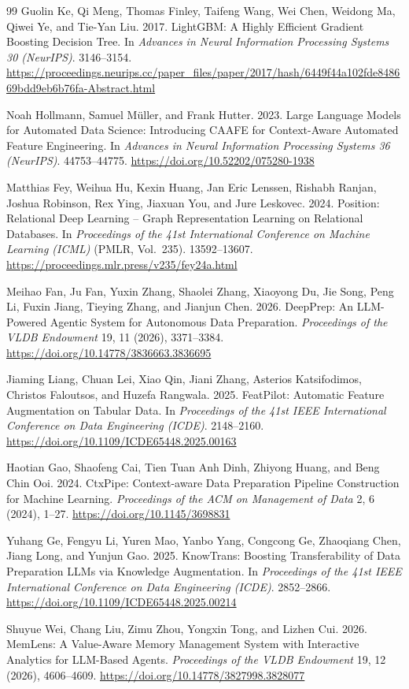 \begin{thebibliography}{99}
Guolin Ke, Qi Meng, Thomas Finley, Taifeng Wang, Wei Chen, Weidong Ma, Qiwei Ye, and Tie-Yan Liu. 2017. LightGBM: A Highly Efficient Gradient Boosting Decision Tree. In \emph{Advances in Neural Information Processing Systems 30 (NeurIPS)}. 3146--3154. \url{https://proceedings.neurips.cc/paper_files/paper/2017/hash/6449f44a102fde848669bdd9eb6b76fa-Abstract.html}

Noah Hollmann, Samuel M\"{u}ller, and Frank Hutter. 2023. Large Language Models for Automated Data Science: Introducing CAAFE for Context-Aware Automated Feature Engineering. In \emph{Advances in Neural Information Processing Systems 36 (NeurIPS)}. 44753--44775. \url{https://doi.org/10.52202/075280-1938}

Matthias Fey, Weihua Hu, Kexin Huang, Jan Eric Lenssen, Rishabh Ranjan, Joshua Robinson, Rex Ying, Jiaxuan You, and Jure Leskovec. 2024. Position: Relational Deep Learning -- Graph Representation Learning on Relational Databases. In \emph{Proceedings of the 41st International Conference on Machine Learning (ICML)} (PMLR, Vol.~235). 13592--13607. \url{https://proceedings.mlr.press/v235/fey24a.html}

Meihao Fan, Ju Fan, Yuxin Zhang, Shaolei Zhang, Xiaoyong Du, Jie Song, Peng Li, Fuxin Jiang, Tieying Zhang, and Jianjun Chen. 2026. DeepPrep: An LLM-Powered Agentic System for Autonomous Data Preparation. \emph{Proceedings of the VLDB Endowment} 19, 11 (2026), 3371--3384. \url{https://doi.org/10.14778/3836663.3836695}

Jiaming Liang, Chuan Lei, Xiao Qin, Jiani Zhang, Asterios Katsifodimos, Christos Faloutsos, and Huzefa Rangwala. 2025. FeatPilot: Automatic Feature Augmentation on Tabular Data. In \emph{Proceedings of the 41st IEEE International Conference on Data Engineering (ICDE)}. 2148--2160. \url{https://doi.org/10.1109/ICDE65448.2025.00163}

Haotian Gao, Shaofeng Cai, Tien Tuan Anh Dinh, Zhiyong Huang, and Beng Chin Ooi. 2024. CtxPipe: Context-aware Data Preparation Pipeline Construction for Machine Learning. \emph{Proceedings of the ACM on Management of Data} 2, 6 (2024), 1--27. \url{https://doi.org/10.1145/3698831}

Yuhang Ge, Fengyu Li, Yuren Mao, Yanbo Yang, Congcong Ge, Zhaoqiang Chen, Jiang Long, and Yunjun Gao. 2025. KnowTrans: Boosting Transferability of Data Preparation LLMs via Knowledge Augmentation. In \emph{Proceedings of the 41st IEEE International Conference on Data Engineering (ICDE)}. 2852--2866. \url{https://doi.org/10.1109/ICDE65448.2025.00214}

Shuyue Wei, Chang Liu, Zimu Zhou, Yongxin Tong, and Lizhen Cui. 2026. MemLens: A Value-Aware Memory Management System with Interactive Analytics for LLM-Based Agents. \emph{Proceedings of the VLDB Endowment} 19, 12 (2026), 4606--4609. \url{https://doi.org/10.14778/3827998.3828077}

\end{thebibliography}

